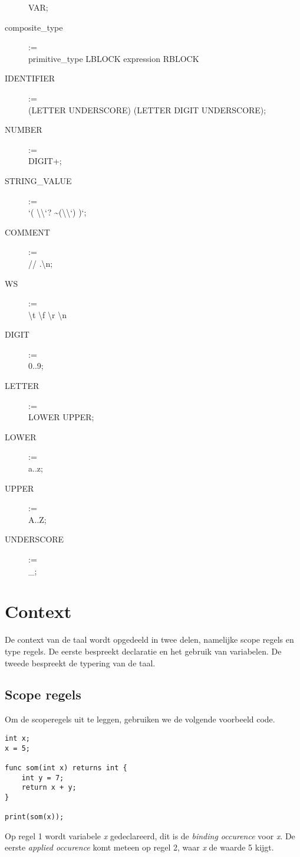 \begin{description}
        VAR;
    \item[composite\_type] := \hfill \\
        primitive\_type LBLOCK expression RBLOCK
    \item[IDENTIFIER] := \hfill \\
        (LETTER \textbar UNDERSCORE) (LETTER \textbar DIGIT \textbar UNDERSCORE);
    \item[NUMBER] := \hfill \\
        DIGIT+;
    \item[STRING\_VALUE] := \hfill \\
        \textquoteleft ( \textbackslash\textbackslash \textquoteleft? \textbar \textasciitilde(\textbackslash\textbackslash \textbar \textquoteleft) )\textasteriskcentered \textquoteleft;
    \item[COMMENT] := \hfill \\
        // .\textasteriskcentered \textbackslash n;
    \item[WS] := \hfill \\
        \textvisiblespace \textbar \textbackslash t \textbar \textbackslash f \textbar \textbackslash r \textbar \textbackslash n
    \item[DIGIT] := \hfill \\
        0..9;
    \item[LETTER] := \hfill \\
        LOWER \textbar UPPER;
    \item[LOWER] := \hfill \\
        a..z;
    \item[UPPER] := \hfill \\
        A..Z;
    \item[UNDERSCORE] := \hfill \\
        \_; 
\end{description}

\section{Context} %
\label{sec:context}
De context van de taal wordt opgedeeld in twee delen, namelijke scope regels en type regels. De eerste bespreekt declaratie en het gebruik van variabelen. De tweede bespreekt de typering van de taal.

\subsection{Scope regels} %
\label{sub:scope_regels}
Om de scoperegels uit te leggen, gebruiken we de volgende voorbeeld code.
\begin{lstlisting}
int x;
x = 5;

func som(int x) returns int {
    int y = 7;
    return x + y;
}

print(som(x));
\end{lstlisting}
Op regel 1 wordt variabele \emph{x} gedeclareerd, dit is de \emph{binding occurence} voor \emph{x}. De eerste \emph{applied occurence} komt meteen op regel 2, waar \emph{x} de waarde 5 kijgt.

